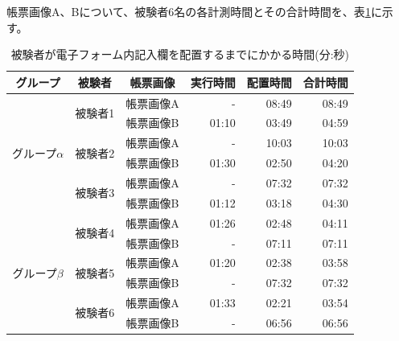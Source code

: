 帳票画像A、Bについて、被験者6名の各計測時間とその合計時間を、表\ref{tb:result_time}に示す。
\begin{table}[tp]
    \caption{被験者が電子フォーム内記入欄を配置するまでにかかる時間(分:秒)}
	\label{tb:result_time}
    \centering
    \begin{tabular}{c|cc||rrr} 
    グループ & 被験者 & 帳票画像 & 実行時間 & 配置時間 & 合計時間 \\
    \hline \hline
    
    \multirow{6}{*}{グループ$\alpha$} & \multirow{2}{*}{被験者1} & 帳票画像A & - & 08:49 & 08:49 \\ %
                                                            & & 帳票画像B & 01:10 & 03:49 & 04:59 \\ 

                                    & \multirow{2}{*}{被験者2} & 帳票画像A & - & 10:03 & 10:03 \\ %
                                                            & & 帳票画像B & 01:30 & 02:50 & 04:20 \\
                                                            
                                    & \multirow{2}{*}{被験者3} & 帳票画像A & - & 07:32 & 07:32 \\ %
                                                            & & 帳票画像B & 01:12 & 03:18 & 04:30 \\
                                                            

                                                            \hline
    \multirow{6}{*}{グループ$\beta$} & \multirow{2}{*}{被験者4} & 帳票画像A & 01:26 & 02:48 & 04:11 \\ %
                                                            & & 帳票画像B & - & 07:11 & 07:11 \\
                                                            
                                    & \multirow{2}{*}{被験者5} & 帳票画像A & 01:20 & 02:38 & 03:58 \\ %
                                                            & & 帳票画像B & - & 07:32 & 07:32 \\ 
                                                            
                                    & \multirow{2}{*}{被験者6} & 帳票画像A & 01:33 & 02:21 & 03:54 \\
                                                            & & 帳票画像B & - & 06:56 & 06:56 \\ 

    \end{tabular}
\end{table}
